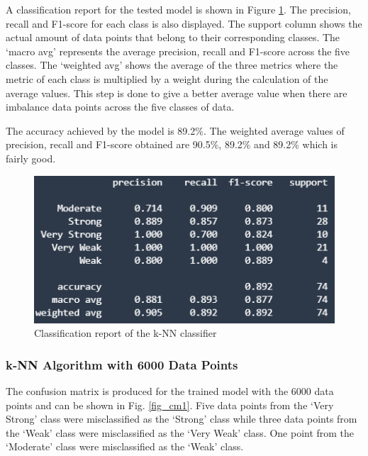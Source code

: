 A classification report for the tested model is shown in Figure \ref{fig_crknn}. The precision, recall and F1-score for each class is also displayed. The support column shows the actual amount of data points that belong to their corresponding classes. The `macro avg' represents the average precision, recall and F1-score across the five classes. The `weighted avg' shows the average of the three metrics where the metric of each class is multiplied by a weight during the calculation of the average values. This step is done to give a better average value when there are imbalance data points across the five classes of data.  

The accuracy achieved by the model is 89.2\%. The weighted average values of precision, recall and F1-score obtained are 90.5\%, 89.2\% and 89.2\% which is fairly good.  

\begin{figure} [ht]
    \centering
    \includegraphics[scale=1.3]{pages/Chapter5/Chapter 5 images/C_report_knn.PNG}
    \caption{Classification report of the k-NN classifier}
    \label{fig_crknn}
\end{figure}


\subsubsection{k-NN Algorithm with 6000 Data Points}
The confusion matrix is produced for the trained model with the 6000 data points and can be shown in  Fig. \ref{fig_cm1}. Five data points from the `Very Strong' class were misclassified as the `Strong' class while three data points from the `Weak' class were misclassified as the `Very Weak' class. One point from the `Moderate' class were misclassified as the `Weak' class.

